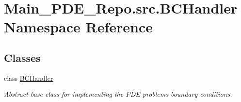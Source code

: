 \hypertarget{namespaceMain__PDE__Repo_1_1src_1_1BCHandler}{}\section{Main\+\_\+\+P\+D\+E\+\_\+\+Repo.\+src.\+B\+C\+Handler Namespace Reference}
\label{namespaceMain__PDE__Repo_1_1src_1_1BCHandler}
\subsection*{Classes}
\begin{DoxyCompactItemize}
\item 
class \hyperlink{classMain__PDE__Repo_1_1src_1_1BCHandler_1_1BCHandler}{B\+C\+Handler}
\begin{DoxyCompactList}\small\item\em Abstract base class for implementing the P\+DE problem\textquotesingle{}s boundary conditions. \end{DoxyCompactList}\end{DoxyCompactItemize}
